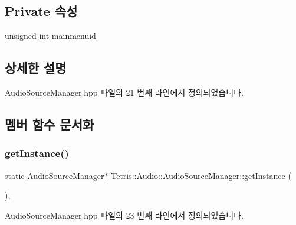 \subsection*{Private 속성}
\begin{DoxyCompactItemize}
\item 
unsigned int \hyperlink{class_tetris_1_1_audio_1_1_audio_source_manager_a6baf8cdd348f47e49ae2337eb9548fa0}{mainmenuid}
\end{DoxyCompactItemize}


\subsection{상세한 설명}


Audio\+Source\+Manager.\+hpp 파일의 21 번째 라인에서 정의되었습니다.



\subsection{멤버 함수 문서화}
\mbox{\label{class_tetris_1_1_audio_1_1_audio_source_manager_a561c580924ee6a13e6453b2d94764548}} 
\subsubsection{\texorpdfstring{get\+Instance()}{getInstance()}}
{\footnotesize\ttfamily static \hyperlink{class_tetris_1_1_audio_1_1_audio_source_manager}{Audio\+Source\+Manager}$\ast$ Tetris\+::\+Audio\+::\+Audio\+Source\+Manager\+::get\+Instance (\begin{DoxyParamCaption}{ }\end{DoxyParamCaption})\hspace{0.3cm}{\ttfamily [inline]}, {\ttfamily [static]}}



Audio\+Source\+Manager.\+hpp 파일의 23 번째 라인에서 정의되었습니다.


